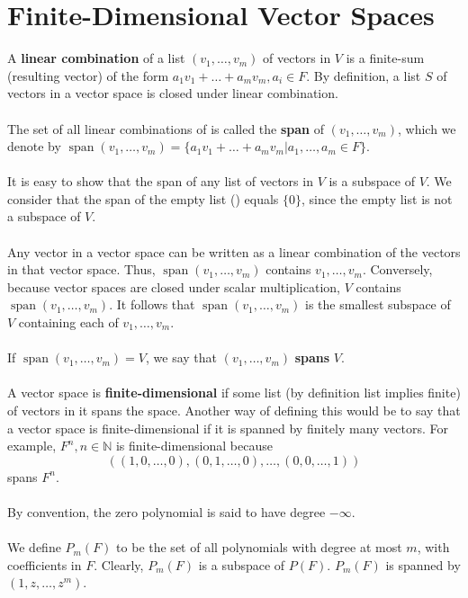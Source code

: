 \documentclass{article}
\DeclareMathOperator{\Span}{span}
\theoremstyle{definition}
\begin{document}
\section{Finite-Dimensional Vector Spaces}
A \textbf{linear combination} of a list $(v_1, \dots, v_m)$ of vectors in $V$ is a finite-sum (resulting vector) of the form $a_1v_1 + \dots + a_mv_m, a_i \in F$. By definition, a list $S$ of vectors in a vector space is closed under linear combination. \\ \\
The set of all linear combinations of is called the \textbf{span} of $(v_1, \dots, v_m)$, which we denote by $\Span(v_1, \dots, v_m) = \{a_1v_1 + \dots + a_mv_m | a_1, \dots, a_m \in F\}$. \\ \\
It is easy to show that the span of any list of vectors in $V$ is a subspace of $V$. We consider that the span of the empty list () equals $\{0\}$, since the empty list is not a subspace of $V$. \\ \\
Any vector in a vector space can be written as a linear combination of the vectors in that vector space. Thus, $\Span(v_1, \dots, v_m)$ contains $v_1, \dots, v_m$. Conversely, because vector spaces are closed under scalar multiplication, $V$ contains $\Span(v_1, \dots, v_m)$. It follows that $\Span(v_1, \dots, v_m)$ is the smallest subspace of $V$ containing each of $v_1, \dots, v_m$. \\ \\
If $\Span(v_1, \dots, v_m) = V$, we say that $(v_1, \dots, v_m)$ \textbf{spans} $V$. \\ \\
A vector space is \textbf{finite-dimensional} if some list (by definition list implies finite) of vectors in it spans the space. Another way of defining this would be to say that a vector space is finite-dimensional if it is spanned by finitely many vectors. For example, $F^n, n \in \mathbb{N}$ is finite-dimensional because $$((1, 0, \dots, 0), (0, 1, \dots, 0), \dots, (0, 0, \dots, 1))$$ spans $F^n$. \\ \\
By convention, the zero polynomial is said to have degree $-\infty$. \\ \\
We define $P_m(F)$ to be the set of all polynomials with degree at most $m$, with coefficients in $F$. Clearly, $P_m(F)$ is a subspace of $P(F)$. $P_m(F)$ is spanned by $(1, z, \dots, z^m)$. \\ \\
\end{document}
